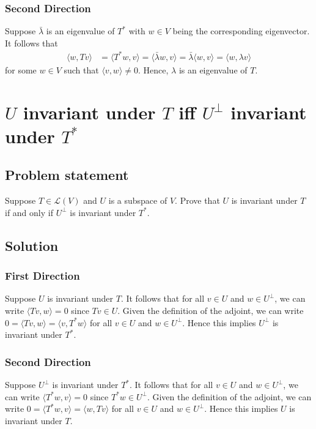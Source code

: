 \documentclass{article}
\begin{document}
\subsubsection*{Second Direction}
Suppose $\bar{\lambda}$ is an eigenvalue of $T^*$ with $w\in V$ being the corresponding eigenvector. It follows that  
\begin{align*}
    \langle w, T v\rangle &= \langle T^*w, v\rangle = \langle \bar{\lambda} w, v\rangle = \bar{\lambda} \langle w, v\rangle = \langle w, \lambda v\rangle
\end{align*}
for some $w\in V$ such that $\langle v,w\rangle\neq 0$. Hence, $\lambda$ is an eigenvalue of $T$.

\clearpage

\section{$U$ invariant under $T$ iff $U^\bot$ invariant under $T^*$}
\subsection*{Problem statement}
Suppose $T\in\mathcal{L}(V)$ and $U$ is a subspace of $V$. Prove that $U$ is invariant under $T$ if and only if $U^\bot$ is invariant under $T^*$.

\subsection*{Solution}
\subsubsection*{First Direction}
Suppose $U$ is invariant under $T$. It follows that for all $v\in U$ and $w\in U^\bot$, we can write $\langle Tv,w\rangle=0$ since $Tv\in U$. Given the definition of the adjoint, we can write $0=\langle Tv,w\rangle=\langle v,T^*w\rangle$ for all $v\in U$ and $w\in U^\bot$. Hence this implies $U^\bot$ is invariant under $T^*$.

\subsubsection*{Second Direction}
Suppose $U^\bot$ is invariant under $T^*$. It follows that for all $v\in U$ and $w\in U^\bot$, we can write $\langle T^* w,v\rangle=0$ since $T^* w\in U^\bot$. Given the definition of the adjoint, we can write $0=\langle T^* w,v\rangle=\langle w,Tv\rangle$ for all $v\in U$ and $w\in U^\bot$. Hence this implies $U$ is invariant under $T$.
\end{document}
